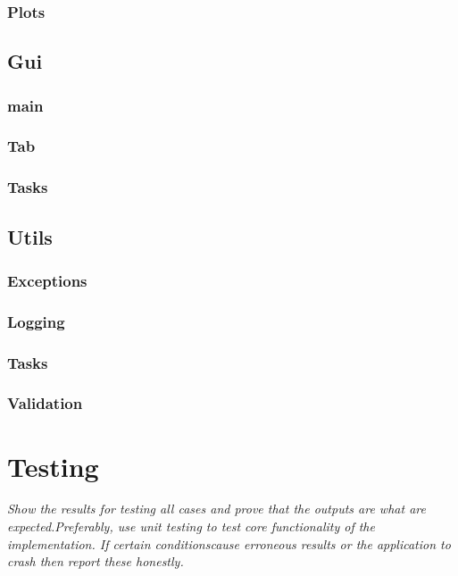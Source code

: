 \documentclass[11pt]{article}
\begin{document}
\subsubsection{Plots}

\subsection{Gui}
\subsubsection{main}

\subsubsection{Tab}

\subsubsection{Tasks}


\subsection{Utils}
\subsubsection{Exceptions}

\subsubsection{Logging}

\subsubsection{Tasks}

\subsubsection{Validation}

\section{Testing}
\emph{Show  the  results  for  testing  all  cases  and  prove  that  the  outputs  are  what  are  expected.Preferably,  use  unit  testing  to  test  core  functionality  of  the  implementation.   If  certain  conditionscause erroneous results or the application to crash then report these honestly.}
\end{document}

